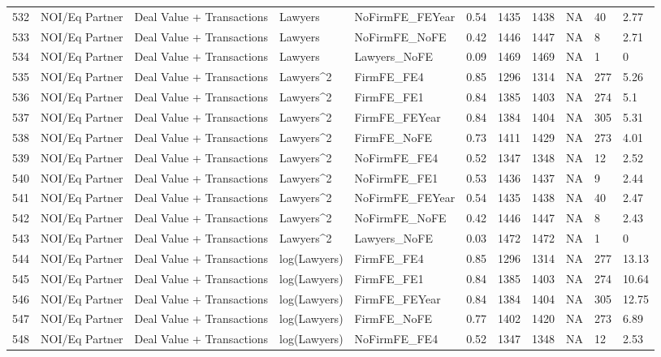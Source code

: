 \documentclass{article}
\begin{document}
\begin{table}[H]
\begin{tabular}{rllllllllll}
  532 & NOI/Eq Partner & Deal Value + Transactions & Lawyers & NoFirmFE\_FEYear & 0.54 & 1435 & 1438 & NA & 40 & 2.77 \\
  533 & NOI/Eq Partner & Deal Value + Transactions & Lawyers & NoFirmFE\_NoFE & 0.42 & 1446 & 1447 & NA & 8 & 2.71 \\
  534 & NOI/Eq Partner & Deal Value + Transactions & Lawyers & Lawyers\_NoFE & 0.09 & 1469 & 1469 & NA & 1 & 0 \\
  535 & NOI/Eq Partner & Deal Value + Transactions & Lawyers^2 & FirmFE\_FE4 & 0.85 & 1296 & 1314 & NA & 277 & 5.26 \\
  536 & NOI/Eq Partner & Deal Value + Transactions & Lawyers^2 & FirmFE\_FE1 & 0.84 & 1385 & 1403 & NA & 274 & 5.1 \\
  537 & NOI/Eq Partner & Deal Value + Transactions & Lawyers^2 & FirmFE\_FEYear & 0.84 & 1384 & 1404 & NA & 305 & 5.31 \\
  538 & NOI/Eq Partner & Deal Value + Transactions & Lawyers^2 & FirmFE\_NoFE & 0.73 & 1411 & 1429 & NA & 273 & 4.01 \\
  539 & NOI/Eq Partner & Deal Value + Transactions & Lawyers^2 & NoFirmFE\_FE4 & 0.52 & 1347 & 1348 & NA & 12 & 2.52 \\
  540 & NOI/Eq Partner & Deal Value + Transactions & Lawyers^2 & NoFirmFE\_FE1 & 0.53 & 1436 & 1437 & NA & 9 & 2.44 \\
  541 & NOI/Eq Partner & Deal Value + Transactions & Lawyers^2 & NoFirmFE\_FEYear & 0.54 & 1435 & 1438 & NA & 40 & 2.47 \\
  542 & NOI/Eq Partner & Deal Value + Transactions & Lawyers^2 & NoFirmFE\_NoFE & 0.42 & 1446 & 1447 & NA & 8 & 2.43 \\
  543 & NOI/Eq Partner & Deal Value + Transactions & Lawyers^2 & Lawyers\_NoFE & 0.03 & 1472 & 1472 & NA & 1 & 0 \\
  544 & NOI/Eq Partner & Deal Value + Transactions & log(Lawyers) & FirmFE\_FE4 & 0.85 & 1296 & 1314 & NA & 277 & 13.13 \\
  545 & NOI/Eq Partner & Deal Value + Transactions & log(Lawyers) & FirmFE\_FE1 & 0.84 & 1385 & 1403 & NA & 274 & 10.64 \\
  546 & NOI/Eq Partner & Deal Value + Transactions & log(Lawyers) & FirmFE\_FEYear & 0.84 & 1384 & 1404 & NA & 305 & 12.75 \\
  547 & NOI/Eq Partner & Deal Value + Transactions & log(Lawyers) & FirmFE\_NoFE & 0.77 & 1402 & 1420 & NA & 273 & 6.89 \\
  548 & NOI/Eq Partner & Deal Value + Transactions & log(Lawyers) & NoFirmFE\_FE4 & 0.52 & 1347 & 1348 & NA & 12 & 2.53 \\

\end{tabular}
\end{table}
\end{document}
